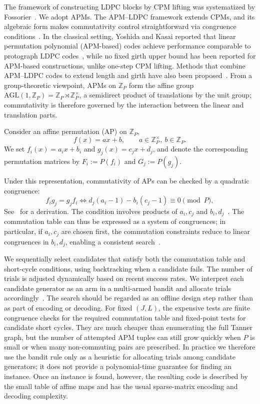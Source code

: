 \documentclass[a4paper,onecolumn,11pt,accepted=2026-08-03]{quantumarticle}
\newcommand{\ZP}{\mathbb{Z}_P}
\newcommand{\ZPx}{\mathbb{Z}_P^{\times}}
\renewcommand\[{\begin{equation}}
\renewcommand\]{\end{equation}}
\theoremstyle{definition}
\begin{document}
The framework of constructing   LDPC blocks by CPM lifting  was systematized by Fossorier~\cite{Fossorier2004}. We adopt   APMs. The APM--LDPC framework extends CPMs, and its algebraic form makes commutativity control straightforward via congruence conditions~\cite{Gholami2015}. In the classical setting, Yoshida and Kasai reported that linear permutation polynomial (APM-based) codes achieve performance comparable to protograph LDPC codes~\cite{YoshidaKasai2019}, while no fixed girth upper bound has been reported for APM-based constructions, unlike one-step CPM lifting. Methods that combine APM--LDPC codes to extend length and girth have also been proposed~\cite{myung2006combining}. From a group-theoretic viewpoint, APMs on $\ZP$ form the affine group $\mathrm{AGL}(1,\ZP)=\ZP\rtimes\ZPx$, a semidirect product of translations by the unit group; commutativity is therefore governed by the interaction between the linear and translation parts.

Consider an affine permutation (AP) on $\ZP$,
\begin{equation*}
  f(x)=ax+b,\qquad a\in\ZPx,\ b\in\ZP.
\end{equation*}
We set $f_i(x)=a_i x+b_i$ and $g_j(x)=c_j x+d_j$, and denote the corresponding permutation matrices by $F_i:=P(f_i)$ and $G_j:=P(g_j)$.

Under this representation, commutativity of APs can be checked by a quadratic congruence:
\[
  f_i g_j = g_j f_i
  \iff
  d_j(a_i-1) - b_i(c_j-1) \equiv 0 \pmod P,
  \tag{C(i,j)}
\]
See~\cite{Gholami2015} for a derivation. The condition involves products of $a_i,c_j$ and $b_i,d_j$~\cite{Gholami2015}. The commutation table can thus be expressed as a system of congruences; in particular, if $a_i,c_j$ are chosen first, the commutation constraints reduce to linear congruences in $b_i,d_j$, enabling a consistent search~\cite{Gholami2015,myung2006combining}.

We sequentially select candidates that satisfy both the commutation table and short-cycle conditions, using backtracking when a candidate fails. The number of trials is adjusted dynamically based on recent success rates. We interpret each candidate generator as an arm in a multi-armed bandit and allocate trials accordingly~\cite{Auer2002}.
 {The search should be regarded as an offline design step rather than as part of encoding or decoding.
For fixed $(J,L)$, the expensive tests are finite congruence checks for the required commutation table and fixed-point tests for candidate short cycles.
They are much cheaper than enumerating the full Tanner graph, but the number of attempted APM tuples can still grow quickly when $P$ is small or when many non-commuting pairs are prescribed.
In practice we therefore use the bandit rule only as a heuristic for allocating trials among candidate generators; it does not provide a polynomial-time guarantee for finding an instance.
Once an instance is found, however, the resulting code is described by the small table of affine maps and has the usual sparse-matrix encoding and decoding complexity.}
 
\end{document}
